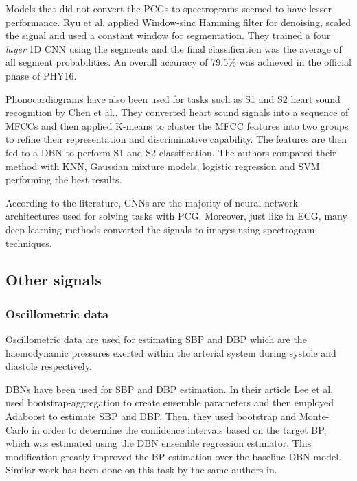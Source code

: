 \documentclass[journal]{IEEEtran}
\begin{document}
Models that did not convert the PCGs to spectrograms seemed to have lesser performance.
Ryu et al.\cite{ryu2016classification} applied Window-sinc Hamming filter for denoising, scaled the signal and used a constant window for segmentation.
They trained a four \textit{layer} 1D CNN using the segments and the final classification was the average of all segment probabilities.
An overall accuracy of 79.5\% was achieved in the official phase of PHY16.

Phonocardiograms have also been used for tasks such as S1 and S2 heart sound recognition by Chen et al.\cite{chen2017s1}.
They converted heart sound signals into a sequence of MFCCs and then applied K-means to cluster the MFCC features into two groups to refine their representation and discriminative capability.
The features are then fed to a DBN to perform S1 and S2 classification.
The authors compared their method with KNN, Gaussian mixture models, logistic regression and SVM performing the best results.

According to the literature, CNNs are the majority of neural network architectures used for solving tasks with PCG\@.
Moreover, just like in ECG, many deep learning methods converted the signals to images using spectrogram techniques\cite{potes2016ensemble, rubin2017recognizing, kucharski2017deep, dominguez2018deep, pan2017variation, shashikumar2017deep}.

\subsection{Other signals}
\subsubsection{Oscillometric data}
Oscillometric data are used for estimating SBP and DBP which are the haemodynamic pressures exerted within the arterial system during systole and diastole respectively\cite{everly2012clinical}.

DBNs have been used for SBP and DBP estimation.
In their article Lee et al.\cite{lee2017deepa} used bootstrap-aggregation to create ensemble parameters and then employed Adaboost to estimate SBP and DBP\@.
Then, they used bootstrap and Monte-Carlo in order to determine the confidence intervals based on the target BP, which was estimated using the DBN ensemble regression estimator.
This modification greatly improved the BP estimation over the baseline DBN model.
Similar work has been done on this task by the same authors in\cite{lee2017oscillometric, lee2017deepc, lee2017deepd}.
\end{document}
